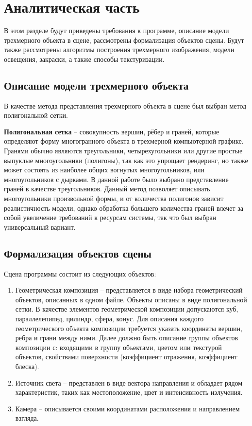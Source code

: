 \chapter{Аналитическая часть}
В этом разделе будут приведены требования к программе, описание модели трехмерного объекта в сцене, рассмотрены формализация объектов сцены. Будут также рассмотрены алгоритмы построения трехмерного изображения, модели освещения, закраски, а также способы текстуризации.
\section{Описание модели трехмерного объекта}
В качестве метода представления трехмерного объекта в сцене был выбран метод полигональной сетки.
 
\textbf{Полигональная сетка} -- совокупность вершин, рёбер и граней, которые определяют форму многогранного объекта в трехмерной компьютерной графике. 
Гранями обычно являются треугольники, четырехугольники или другие простые выпуклые многоугольники (полигоны), так как это упрощает рендеринг, но также может состоять из наиболее общих вогнутых многоугольников, или многоугольников с дырками. В данной работе было выбрано представление граней в качестве треугольников. Данный метод позволяет описывать многоугольники произвольной формы, и от количества полигонов зависит реалистичность модели, однако обработка большего количества граней влечет за собой увеличение требований к ресурсам системы, так что был выбран универсальный вариант.
\section{Формализация объектов сцены}
Сцена программы состоит из следующих объектов:
\begin{enumerate}
\item Геометрическая композиция -- представляется в виде набора геометрический объектов, описанных в одном файле. Объекты описаны в виде полигональной сетки. В качестве элементов геометрической композиции допускаются куб, параллелепипед, цилиндр, сфера, конус. Для описания каждого геометрического объекта композиции требуется указать координаты вершин, ребра и грани между ними. Далее должно быть описание группы объектов композиции с: входящими в группу объектами, цветом или текстурой объектов, свойствами поверхности (коэффициент отражения, коэффициент блеска).
\item Источник света -- представлен в виде вектора направления и обладает рядом характеристик, таких как местоположение, цвет и интенсивность излучения.
\item Камера -- описывается своими координатами расположения и направлением взгляда.
\end{enumerate}
